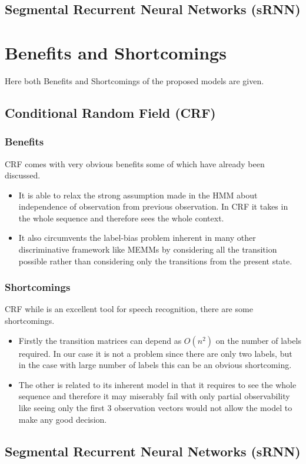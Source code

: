 \documentclass[letterpaper]{article} %
\begin{document}
\subsection{Segmental Recurrent Neural Networks (sRNN)}

\section{Benefits and Shortcomings}
Here both Benefits and Shortcomings of the proposed models are given.
\subsection{Conditional Random Field (CRF)}
\subsubsection{Benefits} CRF comes with very obvious benefits some of which have already been discussed.
\begin{itemize}
\item It is able to relax the strong assumption made in the HMM about independence of observation from previous observation. In CRF it takes in the whole sequence and therefore sees the whole context.
\item It also circumvents the label-bias problem inherent in many other discriminative framework like MEMMs by considering all the transition possible rather than considering only the transitions from the present state.
\end{itemize}

\subsubsection{Shortcomings} CRF while is an excellent tool for speech recognition, there are some shortcomings.
\begin{itemize}
\item Firstly the transition matrices can depend as $O(n^2)$ on the number of labels required. In our case it is not a problem since there are only two labels, but in the case with large number of labels this can be an obvious shortcoming.
\item The other is related to its inherent model in that it requires to see the whole sequence and therefore it may miserably fail with only partial observability like seeing only the first 3 observation vectors would not allow the model to make any good decision.
\end{itemize}
\subsection{Segmental Recurrent Neural Networks (sRNN)}



\end{document}
